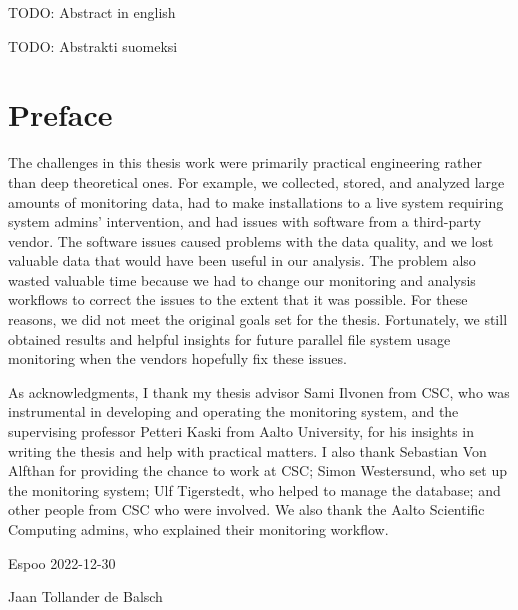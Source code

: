 \makecoverpage
\makecopyrightpage


\begin{abstractpage}[english]
TODO: Abstract in english
\end{abstractpage}



\begin{abstractpage}[finnish]
TODO: Abstrakti suomeksi
\end{abstractpage}


\section*{Preface}
The challenges in this thesis work were primarily practical engineering rather than deep theoretical ones.
For example, we collected, stored, and analyzed large amounts of monitoring data, had to make installations to a live system requiring system admins' intervention, and had issues with software from a third-party vendor.
The software issues caused problems with the data quality, and we lost valuable data that would have been useful in our analysis.
The problem also wasted valuable time because we had to change our monitoring and analysis workflows to correct the issues to the extent that it was possible.
For these reasons, we did not meet the original goals set for the thesis.
Fortunately, we still obtained results and helpful insights for future parallel file system usage monitoring when the vendors hopefully fix these issues.

As acknowledgments, I thank my thesis advisor Sami Ilvonen from CSC, who was instrumental in developing and operating the monitoring system, and the supervising professor Petteri Kaski from Aalto University, for his insights in writing the thesis and help with practical matters.
I also thank Sebastian Von Alfthan for providing the chance to work at CSC; Simon Westersund, who set up the monitoring system; Ulf Tigerstedt, who helped to manage the database; and other people from CSC who were involved.
We also thank the Aalto Scientific Computing admins, who explained their monitoring workflow.

\vspace{5cm}
Espoo 2022-12-30

\vspace{5mm}
{\hfill Jaan Tollander de Balsch \hspace{1cm}}

\newpage

\setcounter{tocdepth}{2}
\tableofcontents
